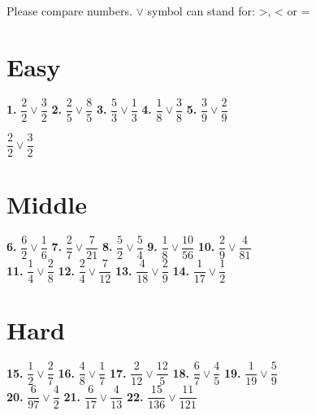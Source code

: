 \documentclass[a4paper]{article}
\begin{document}
{\large Please compare numbers. $\vee$ symbol can stand for: >, < or =}	
		
\section* {\Large Easy}
		
\Large {
\textbf{1.} $\dfrac{2}{2}\vee\dfrac{3}{2}$ \hspace{0.25cm}
\textbf{2.} $\dfrac{2}{5}\vee\dfrac{8}{5}$ \hspace{0.25cm}
\textbf{3.} $\dfrac{5}{3}\vee\dfrac{1}{3}$ \hspace{0.25cm}
\textbf{4.} $\dfrac{1}{8}\vee\dfrac{3}{8}$ \hspace{0.25cm}
\textbf{5.} $\dfrac{3}{9}\vee\dfrac{2}{9}$
}

$\dfrac{2}{2}\vee\dfrac{3}{2}$
		
\section* {\Large Middle}
		
\Large {
\textbf{6.} $\dfrac{6}{2}\vee\dfrac{1}{6}$ \hspace{0.25cm}
\textbf{7.} $\dfrac{2}{7}\vee\dfrac{7}{21}$ \hspace{0.25cm}
\textbf{8.} $\dfrac{5}{2}\vee\dfrac{5}{4}$ \hspace{0.25cm}
\textbf{9.} $\dfrac{1}{8}\vee\dfrac{10}{56}$ \hspace{0.25cm}
\textbf{10.} $\dfrac{2}{9}\vee\dfrac{4}{81}$ \\ [0.25cm]
\textbf{11.} $\dfrac{1}{4}\vee\dfrac{2}{8}$ \hspace{0.25cm}
\textbf{12.} $\dfrac{2}{4}\vee\dfrac{7}{12}$ \hspace{0.25cm}
\textbf{13.} $\dfrac{4}{18}\vee\dfrac{2}{9}$ \hspace{0.25cm}
\textbf{14.} $\dfrac{1}{17}\vee\dfrac{1}{2}$
}
		
\section* {\Large Hard}

\Large {
\textbf{15.} $\dfrac{1}{2}\vee\dfrac{2}{7}$ \hspace{0.25cm}
\textbf{16.} $\dfrac{4}{8}\vee\dfrac{1}{7}$ \hspace{0.25cm}
\textbf{17.} $\dfrac{2}{12}\vee\dfrac{12}{5}$ \hspace{0.25cm}
\textbf{18.} $\dfrac{6}{7}\vee\dfrac{4}{5}$  \hspace{0.25cm}
\textbf{19.} $\dfrac{1}{19}\vee\dfrac{5}{9}$ \\[0.25cm]
\textbf{20.} $\dfrac{6}{97}\vee\dfrac{4}{2}$ \hspace{0.25cm}
\textbf{21.} $\dfrac{6}{17}\vee\dfrac{4}{13}$ \hspace{0.25cm}
\textbf{22.} $\dfrac{15}{136}\vee\dfrac{11}{121}$
}
\end{document}
